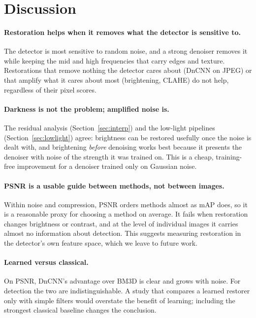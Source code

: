 \documentclass[11pt]{article}
\newcommand{\secref}[1]{Section~\ref{#1}}
\begin{document}
\section{Discussion}
\label{sec:discussion}

\paragraph{Restoration helps when it removes what the detector is sensitive to.} The detector is most sensitive to random noise, and a strong denoiser removes it while keeping the mid and high frequencies that carry edges and texture. Restorations that remove nothing the detector cares about (DnCNN on JPEG) or that amplify what it cares about most (brightening, CLAHE) do not help, regardless of their pixel scores.

\paragraph{Darkness is not the problem; amplified noise is.} The residual analysis (\secref{sec:interp}) and the low-light pipelines (\secref{sec:lowlight}) agree: brightness can be restored usefully once the noise is dealt with, and brightening \emph{before} denoising works best because it presents the denoiser with noise of the strength it was trained on. This is a cheap, training-free improvement for a denoiser trained only on Gaussian noise.

\paragraph{PSNR is a usable guide between methods, not between images.} Within noise and compression, PSNR orders methods almost as mAP does, so it is a reasonable proxy for choosing a method on average. It fails when restoration changes brightness or contrast, and at the level of individual images it carries almost no information about detection. This suggests measuring restoration in the detector's own feature space, which we leave to future work.

\paragraph{Learned versus classical.} On PSNR, DnCNN's advantage over BM3D is clear and grows with noise. For detection the two are indistinguishable. A study that compares a learned restorer only with simple filters would overstate the benefit of learning; including the strongest classical baseline changes the conclusion.
\end{document}
